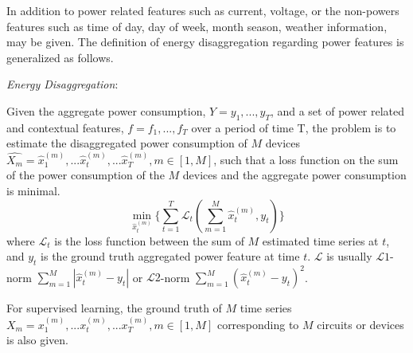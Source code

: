 In addition to 
power related features such as current, voltage, 
or the non-powers features such as time of day, day of week, month season,
weather information, may be given. 
The definition of energy disaggregation regarding power features
is generalized as follows. 

\textit{Energy Disaggregation}:

Given the aggregate power consumption, $Y=y_1, ..., y_T$, and a set of
power related and contextual features, $f=f_1, ..., f_T$ over a period of time T, 
the problem is to estimate the disaggregated power consumption of $M$ devices 
$\hat{X_m }= \hat{x}_{1}^{(m)}, ...\hat{x}_{t}^{(m)}, ... \hat{x}_{T}^{(m)}, m\in[1, M]$, 
such that a loss function on the sum of the power consumption of the $M$
devices and the aggregate power consumption is minimal. 
\begin{equation}
\label{eq_powerObj}
\min_{\hat{x}_{t}^{(m)}} \{ \sum_{t=1}^T \mathscr{L}_t(\sum_{m=1}^M \hat{x}_{t}^{(m)}, y_t) \}
\end{equation}
where $\mathscr{L}_t$ is the loss function between 
the sum of $M$ estimated time series at $t$, 
and $y_t$ is the ground truth aggregated power feature at time $t$. 
$\mathscr{L}$ is usually $\mathscr{L}1$-norm $\sum_{m=1}^M |\hat{x}_{t}^{(m)} - y_t|$
or $\mathscr{L}2$-norm $\sum_{m=1}^M (\hat{x}_{t}^{(m)}-y_t)^2$.

For supervised learning, 
the ground truth of $M$ time series 
$X_m = x_{1}^{(m)}, ...x_{t}^{(m)}, ... x_{T}^{(m)}, m\in[1, M]$ 
corresponding to $M$ circuits or devices is also given.




